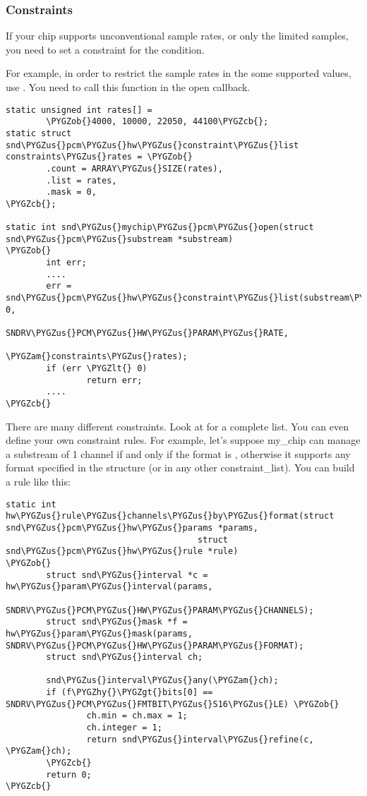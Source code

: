 \documentclass[a4paper,8pt,english]{sphinxmanual}
\def\PYGZus{\char`\_}
\def\PYGZob{\char`\{}
\def\PYGZcb{\char`\}}
\def\PYGZam{\char`\&}
\def\PYGZlt{\char`\<}
\def\PYGZgt{\char`\>}
\def\PYGZhy{\char`\-}
\begin{document}
\subsubsection{Constraints}
\label{sound/kernel-api/writing-an-alsa-driver:constraints}
If your chip supports unconventional sample rates, or only the limited
samples, you need to set a constraint for the condition.

For example, in order to restrict the sample rates in the some supported
values, use . You need to
call this function in the open callback.

\begin{Verbatim}[commandchars=\\\{\}]
static unsigned int rates[] =
        \PYGZob{}4000, 10000, 22050, 44100\PYGZcb{};
static struct snd\PYGZus{}pcm\PYGZus{}hw\PYGZus{}constraint\PYGZus{}list constraints\PYGZus{}rates = \PYGZob{}
        .count = ARRAY\PYGZus{}SIZE(rates),
        .list = rates,
        .mask = 0,
\PYGZcb{};

static int snd\PYGZus{}mychip\PYGZus{}pcm\PYGZus{}open(struct snd\PYGZus{}pcm\PYGZus{}substream *substream)
\PYGZob{}
        int err;
        ....
        err = snd\PYGZus{}pcm\PYGZus{}hw\PYGZus{}constraint\PYGZus{}list(substream\PYGZhy{}\PYGZgt{}runtime, 0,
                                         SNDRV\PYGZus{}PCM\PYGZus{}HW\PYGZus{}PARAM\PYGZus{}RATE,
                                         \PYGZam{}constraints\PYGZus{}rates);
        if (err \PYGZlt{} 0)
                return err;
        ....
\PYGZcb{}
\end{Verbatim}

There are many different constraints. Look at  for a
complete list. You can even define your own constraint rules. For
example, let's suppose my\_chip can manage a substream of 1 channel if
and only if the format is , otherwise it supports any format
specified in the  structure (or in any other
constraint\_list). You can build a rule like this:

\begin{Verbatim}[commandchars=\\\{\}]
static int hw\PYGZus{}rule\PYGZus{}channels\PYGZus{}by\PYGZus{}format(struct snd\PYGZus{}pcm\PYGZus{}hw\PYGZus{}params *params,
                                      struct snd\PYGZus{}pcm\PYGZus{}hw\PYGZus{}rule *rule)
\PYGZob{}
        struct snd\PYGZus{}interval *c = hw\PYGZus{}param\PYGZus{}interval(params,
                      SNDRV\PYGZus{}PCM\PYGZus{}HW\PYGZus{}PARAM\PYGZus{}CHANNELS);
        struct snd\PYGZus{}mask *f = hw\PYGZus{}param\PYGZus{}mask(params, SNDRV\PYGZus{}PCM\PYGZus{}HW\PYGZus{}PARAM\PYGZus{}FORMAT);
        struct snd\PYGZus{}interval ch;

        snd\PYGZus{}interval\PYGZus{}any(\PYGZam{}ch);
        if (f\PYGZhy{}\PYGZgt{}bits[0] == SNDRV\PYGZus{}PCM\PYGZus{}FMTBIT\PYGZus{}S16\PYGZus{}LE) \PYGZob{}
                ch.min = ch.max = 1;
                ch.integer = 1;
                return snd\PYGZus{}interval\PYGZus{}refine(c, \PYGZam{}ch);
        \PYGZcb{}
        return 0;
\PYGZcb{}
\end{Verbatim}
\end{document}
